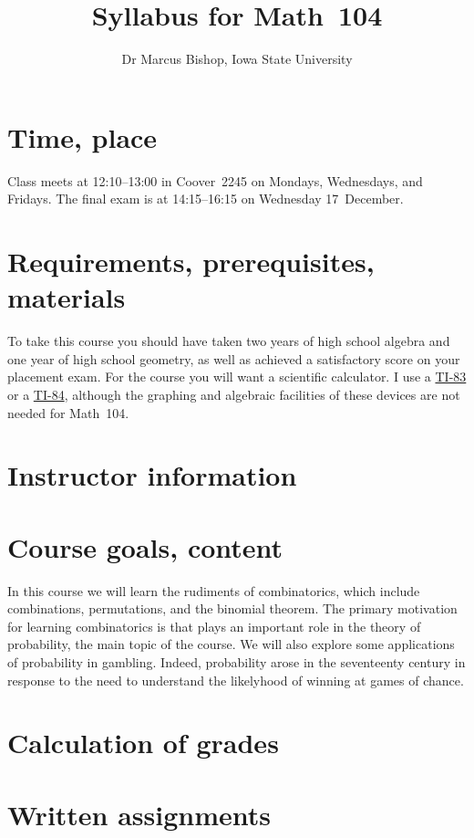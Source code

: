 \documentclass[11pt]{article}
\title{Syllabus for Math~104}
\author{Dr Marcus Bishop, Iowa State University}
\begin{document}
\maketitle

\section{Time, place}\label{Time} Class meets at 12:10--13:00
in Coover~2245 on Mondays, Wednesdays, and Fridays.
The final exam is at 14:15--16:15 on Wednesday 17~December.

\section{Requirements, prerequisites, materials}\label{Require}
To take this course you should have taken two
years of high school algebra and one year of high school geometry,
as well as achieved a satisfactory score on your placement exam.
For the course you will want a scientific calculator.
I use a \href{http://en.wikipedia.org/wiki/TI-83}{TI-83} or a
\href{http://en.wikipedia.org/wiki/TI-84}{TI-84}, although
the graphing and algebraic facilities of these devices are
not needed for Math~104.

\section{Instructor information}
\section{Course goals, content}
In this course we will learn the rudiments of combinatorics,
which include combinations, permutations, and the binomial theorem.
The primary motivation for learning combinatorics is that
plays an important role in the theory of probability, the main
topic of the course. We will also explore some
applications of probability in gambling. Indeed, probability
arose in the seventeenty century in response to the need
to understand the likelyhood of winning at games of chance.

\section{Calculation of grades}\label{Assessment}
\section{Written assignments}\label{Written}
\end{document}
